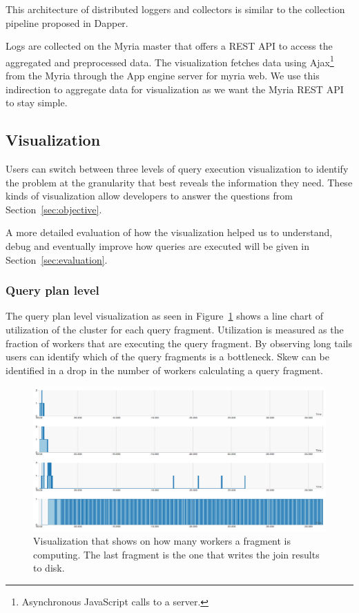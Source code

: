 \documentclass[11pt]{scrartcl}
\begin{document}
This architecture of distributed loggers and collectors is similar to the collection pipeline proposed in Dapper\cite{sigelman2010dapper}.

Logs are collected on the Myria master that offers a REST API to access the aggregated and preprocessed data. The visualization fetches data using Ajax\footnote{Asynchronous JavaScript calls to a server.} from the Myria through the App engine server for myria web. We use this indirection to aggregate data for visualization as we want the Myria REST API to stay simple.


\subsection{Visualization}
\label{sec:visualization}

Users can switch between three levels of query execution visualization to identify the problem at the granularity that best reveals the information they need. These kinds of visualization allow developers to answer the questions from Section~\ref{sec:objective}.


A more detailed evaluation of how the visualization helped us to understand, debug and eventually improve how queries are executed will be given in Section~\ref{sec:evaluation}.

\subsubsection{Query plan level}

The query plan level visualization as seen in Figure~\ref{fig:frags} shows a line chart of utilization of the cluster for each query fragment. Utilization is measured as the fraction of workers that are executing the query fragment. By observing long tails users can identify which of the query fragments is a bottleneck. Skew can be identified in a drop in the number of workers calculating a query fragment.

\begin{figure}[h]
  \begin{center}
    \includegraphics[width=\textwidth]{fragments_lines}
  \end{center}
  \caption{Visualization that shows on how many workers a fragment is computing. The last fragment is the one that writes the join results to disk.}
  \label{fig:frags}
\end{figure}
\end{document}
